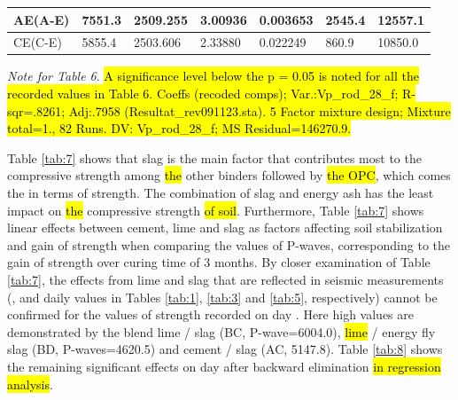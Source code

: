 \documentclass[materials,article,submit,pdftex,moreauthors]{Definitions/mdpi}
\begin{document}
\begin{table}[H]
\begin{threeparttable}
\begin{tabular}{|l|l|l|l|l|l|l|}
        AE(A-E) & 7551.3 & 2509.255 & 3.00936 & 0.003653 & 2545.4 & 12557.1 \\ \hline
        CE(C-E) & 5855.4 & 2503.606 & 2.33880 & 0.022249 & 860.9 & 10850.0 \\ \hline
    \end{tabular}
    \label{tab:6}
    \begin{tablenotes}
      \scriptsize
      	\item \emph{Note for Table 6}. \hl{A significance level below the p = 0.05 is noted for all the recorded values in Table 6. Coeffs (recoded comps); Var.:Vp\_rod\_28\_f; R-sqr=.8261; Adj:.7958 (Resultat\_rev091123.sta). 5 Factor mixture design; Mixture total=1., 82 Runs. DV: Vp\_rod\_28\_f; MS Residual=146270.9.} 
    \end{tablenotes}
  \end{threeparttable}
\end{table}

Table \ref{tab:7} shows that slag is the main factor that contributes most to the compressive strength among \hl{the} other binders followed by \hl{the OPC}, which comes the  in terms of strength. The combination of slag and energy ash has the least impact on \hl{the} compressive strength \hl{of soil}. Furthermore, Table \ref{tab:7} shows linear effects between cement, lime and slag as factors affecting soil stabilization and gain of strength when comparing the values of P-waves, corresponding to the gain of strength over curing time of 3 months. By closer examination of Table \ref{tab:7}, the effects from lime and slag that\hl{ }are reflected in\hl{ }seismic measurements (,  and  daily values in Tables \ref{tab:1}, \ref{tab:3} and \ref{tab:5}, respectively) cannot be confirmed for the values of strength recorded on day . Here high values are demonstrated by the blend lime / slag (BC, P-wave=6004.0), \hl{lime} / energy fly slag (BD, P-waves=4620.5) and cement / slag (AC, 5147.8). Table \ref{tab:8} shows the remaining significant effects on day  after\hl{ }backward elimination \hl{in regression analysis}.
\end{document}
